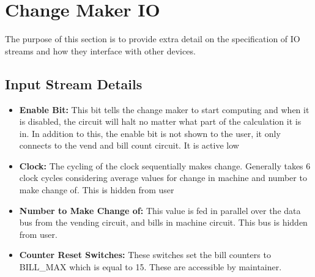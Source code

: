 \section{Change Maker IO}
The purpose of this section is to provide extra detail on
the specification of IO streams and how they interface
with other devices. 

\subsection{Input Stream Details}
\begin{itemize}
\item{\textbf{Enable Bit:} This bit tells the change maker to start computing
and when it is disabled, the circuit will halt no matter what part of
the calculation it is in. In addition to this, the enable bit is not
shown to the user, it only connects to the vend and bill count circuit. It is active low}
\item{\textbf{Clock:} The cycling of the clock sequentially makes change. 
Generally takes 6 clock cycles considering average values for change in 
machine and number to make change of. This is hidden from user}
\item{\textbf{Number to Make Change of:} This value is fed in parallel over the
data bus from the vending circuit, and bills in machine circuit. This
bus is hidden from user.}
\item{\textbf{Counter Reset Switches:} These switches set the bill counters to
BILL\_MAX which is equal to 15. These are accessible by maintainer.}
\end{itemize}

